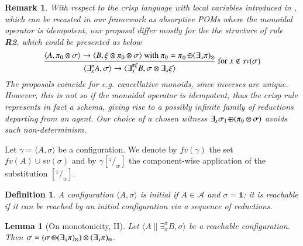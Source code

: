 \documentclass[preprint,12pt]{elsarticle}
\newtheorem{definition}{Definition}
\newtheorem{remark}{Remark}
\newtheorem{lemma}{Lemma}
\def\1{{\mathbf 1}}
\def\1{{\mathbf 1}}
\def\odiv{\, {\ominus\hspace{-7.7pt} \div} \,}
\begin{document}
\begin{remark}
	\label{crisp}
	With respect to the crisp language with local variables introduced in \cite{pippo},
	which can be recasted in our framework as absorptive POMs
	where the monoidal operator is idempotent,
	our proposal differ mostly for the the structure of rule \mbox{\bf R2}, which could 
	be presented as below
	$$\frac {\displaystyle \langle A, \pi_0 \otimes \sigma \rangle
		\to \langle B, \xi \otimes \pi_0 \otimes \sigma \rangle \text{ with } \pi_0 = \pi_\otimes \odiv (\exists_x \pi)_\otimes}
	{\displaystyle\langle \exists^{\pi}_x A,\sigma\rangle \to \langle 
		\exists^{\pi \xi}_x B, \sigma \otimes \exists_x \xi
		\rangle} \text{ for } x \not \in sv(\sigma)$$
	The proposals coincide for e.g. cancellative monoids, since inverses are unique.
	However, this is not so if the monoidal operator is idempotent, thus 
	the crisp rule represents in fact a schema, giving rise to a possibly infinite
	family of reductions departing from an agent. Our choice of a chosen witness 
	$\exists_x \sigma_1 \odiv (\pi_0 \otimes \sigma)$ avoids such non-determinism.
\end{remark}

Let $\gamma = \langle A, \sigma \rangle$ be a configuration.
%
We denote by $fv(\gamma)$ the set $fv(A) \cup sv(\sigma)$ and by
$\gamma[^z/_w]$ the component-wise application of the substitution $[^z/_w]$.

\begin{definition}
	A configuration $\langle A, \sigma \rangle$ is initial if $A\in \mathcal{A}$
	and $\sigma = \1$; it is reachable if it can be reached by an initial configuration 
	via a sequence of reductions.
\end{definition}

\begin{lemma}[On monotonicity, II]
	\label{mono2}
	Let $\langle A \parallel \exists_x^\pi B, \sigma \rangle$ 
	be a reachable configuration.
	Then $\sigma = (\sigma \odiv (\exists_x \pi)_\otimes) \otimes (\exists_x \pi)_\otimes$.
\end{lemma}
\end{document}
